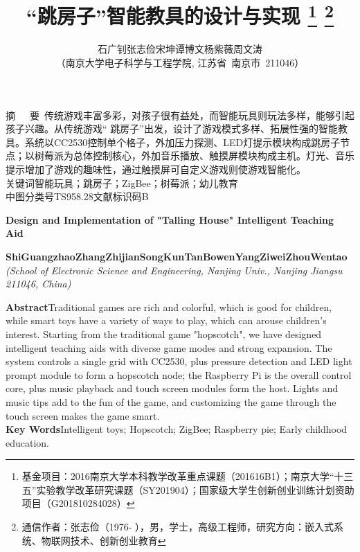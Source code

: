 \documentclass[a4paper,11pt,onecolumn,twoside]{article}
\title{\huge{“跳房子”智能教具的设计与实现}
\thanks{基金项目：2016南京大学本科教学改革重点课题（201616B1）；南京大学“十三五”实验教学改革研究课题（SY201904）；国家级大学生创新创业训练计划资助项目（G201810284028）}
\thanks{通信作者：张志俭（1976- ），男，学士，高级工程师，研究方向：嵌入式系统、物联网技术、创新创业教育}
}
\author{石广钊\quad 张志俭\quad 宋坤\quad  谭博文\quad 杨紫薇\quad 周文涛\\[2pt]
\normalsize
（南京大学电子科学与工程学院, 江苏省~南京市~211046） \\[2pt]}
\date{}  %
\begin{document}
\maketitle

\setlength{\oddsidemargin}{ 1cm}  %
\setlength{\evensidemargin}{\oddsidemargin}
\setlength{\textwidth}{13.50cm}
\vspace{-.8cm}
\begin{center}
\parbox{\textwidth}{
\heiti 摘~~~要\quad \kaishu~传统游戏丰富多彩，对孩子很有益处，而智能玩具则玩法多样，能够引起孩子兴趣。从传统游戏“ 跳房子”出发，设计了游戏模式多样、拓展性强的智能教具。系统以CC2530控制单个格子，外加压力探测、LED灯提示模块构成跳房子节点；以树莓派为总体控制核心，外加音乐播放、触摸屏模块构成主机。灯光、音乐提示增加了游戏的趣味性，通过触摸屏可自定义游戏则使游戏智能化。\\
\heiti 关键词\quad\kaishu 智能玩具；跳房子；ZigBee；树莓派；幼儿教育\\
\heiti 中图分类号\quad TS958.28\qquad  \heiti 文献标识码\quad B}
\end{center}
\vspace{.1cm}
\begin{center}
\parbox{\textwidth}{
{\large{\textbf{Design and Implementation of "Talling House" Intelligent Teaching Aid}}}\\
\vspace{-0.5cm}
\begin{center}
\textbf{ShiGuangzhao\quad ZhangZhijian\quad SongKun\quad TanBowen\quad YangZiwei\quad ZhouWentao}\\[2pt]
\small{\textit{(School of Electronic Science and Engineering, Nanjing Univ., Nanjing Jiangsu 211046, China)}}\\[2pt]
\end{center}
{\small{\textbf{Abstract}\quad Traditional games are rich and colorful, which is good for children, while smart toys have a variety of ways to play, which can arouse children's interest. Starting from the traditional game "hopscotch", we have designed intelligent teaching aids with diverse game modes and strong expansion. The system controls a single grid with CC2530, plus pressure detection and LED light prompt module to form a hopscotch node; the Raspberry Pi is the overall control core, plus music playback and touch screen modules form the host. Lights and music tips add to the fun of the game, and customizing the game through the touch screen makes the game smart. \\
\textbf{Key Words}\quad Intelligent toys; Hopscotch; ZigBee; Raspberry pie; Early childhood education.}}
}
\end{center}
\end{document}
